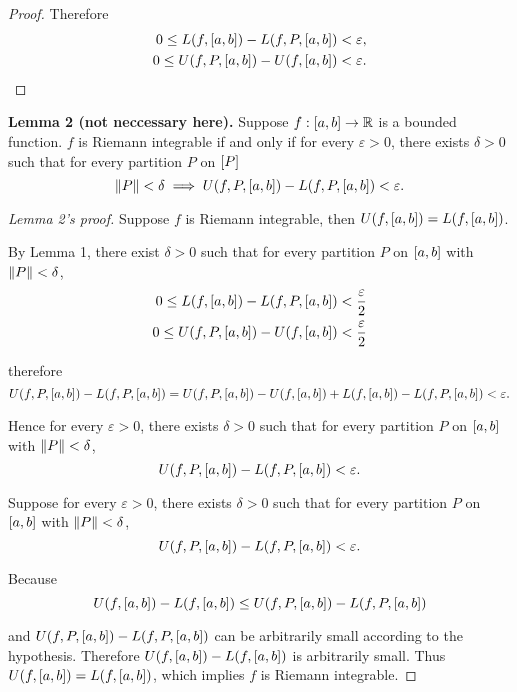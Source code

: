 \begin{proof}
    Therefore
    \[
        \begin{split}
            0 \leq L(f, \left[{a, b}\right]) - L(f, P, \left[{a, b}\right]) < \varepsilon, \\
            0 \leq U(f, P, \left[{a, b}\right]) - U(f, \left[{a, b}\right]) < \varepsilon.
        \end{split}
    \]
\end{proof}

\noindent\textbf{Lemma 2 (not neccessary here).} Suppose $f: \left[{a, b}\right]\to\mathbb{R}$ is a bounded function. $f$ is Riemann integrable if and only if for every $\varepsilon > 0$, there exists $\delta > 0$ such that for every partition $P$ on $\left[{P}\right]$
\[
    \left\Vert{P}\right\Vert < \delta \implies U(f, P, \left[{a, b}\right]) - L(f, P, \left[{a, b}\right]) < \varepsilon.
\]

\begin{proof}[Lemma 2's proof]
    Suppose $f$ is Riemann integrable, then $U(f, \left[{a, b}\right]) = L(f, \left[{a, b}\right])$.

    By Lemma 1, there exist $\delta > 0$ such that for every partition $P$ on $\left[{a, b}\right]$ with $\left\Vert{P}\right\Vert < \delta$,
    \[
        \begin{split}
            0\leq L(f, \left[{a, b}\right]) - L(f, P, \left[{a, b}\right]) < \frac{\varepsilon}{2} \\
            0\leq U(f, P, \left[{a, b}\right]) - U(f, \left[{a, b}\right]) < \frac{\varepsilon}{2}
        \end{split}
    \]

    therefore
    \[
        U(f, P, \left[{a, b}\right]) - L(f, P, \left[{a, b}\right]) = U(f, P, \left[{a, b}\right]) - U(f, \left[{a, b}\right]) + L(f, \left[{a, b}\right]) - L(f, P, \left[{a, b}\right]) < \varepsilon.
    \]

    Hence for every $\varepsilon > 0$, there exists $\delta > 0$ such that for every partition $P$ on $\left[{a, b}\right]$ with $\left\Vert{P}\right\Vert < \delta$,
    \[
        U(f, P, \left[{a, b}\right]) - L(f, P, \left[{a, b}\right]) < \varepsilon.
    \]

    \bigskip
    Suppose for every $\varepsilon > 0$, there exists $\delta > 0$ such that for every partition $P$ on $\left[{a, b}\right]$ with $\left\Vert{P}\right\Vert < \delta$,
    \[
        U(f, P, \left[{a, b}\right]) - L(f, P, \left[{a, b}\right]) < \varepsilon.
    \]

    Because
    \[
        U(f, \left[{a, b}\right]) - L(f, \left[{a, b}\right]) \leq U(f, P, \left[{a, b}\right]) - L(f, P, \left[{a, b}\right])
    \]

    and $U(f, P, \left[{a, b}\right]) - L(f, P, \left[{a, b}\right])$ can be arbitrarily small according to the hypothesis. Therefore $U(f, \left[{a, b}\right]) - L(f, \left[{a, b}\right])$ is arbitrarily small. Thus $U(f, \left[{a, b}\right]) = L(f, \left[{a, b}\right])$, which implies $f$ is Riemann integrable.
\end{proof}

